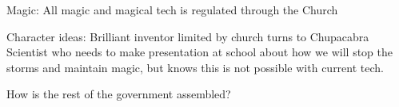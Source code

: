 \documentclass[blue]{GL2020}
\begin{document}
Magic:	All magic and magical tech is regulated through the Church

Character ideas:  Brilliant inventor limited by church turns to Chupacabra
									Scientist who needs to make presentation at school about how we will stop the storms and
										maintain magic, but knows this is not possible with current tech.
									







 How is the rest of the government assembled?
\end{document}
